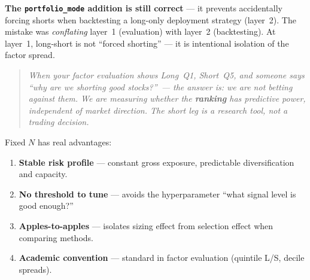 \documentclass[a4paper, 11pt]{report}
\theoremstyle{definition}
\theoremstyle{remark}
\begin{document}
\begin{description}[style=nextline, leftmargin=1.8cm]
        \begin{center}
        \small
        \end{center}

        \medskip
        \textbf{The \texttt{portfolio\_mode} addition is still
        correct} --- it prevents accidentally forcing shorts when
        backtesting a long-only deployment strategy (layer~2).  The
        mistake was \emph{conflating} layer~1 (evaluation) with
        layer~2 (backtesting).  At layer~1, long-short is not
        ``forced shorting'' --- it is intentional isolation of the
        factor spread.

    \item[Lesson]
        \begin{quote}
        \emph{When your factor evaluation shows Long~Q1, Short~Q5,
        and someone says ``why are we shorting good stocks?''\ ---
        the answer is: we are not betting against them.  We are
        measuring whether the \textbf{ranking} has predictive power,
        independent of market direction.  The short leg is a
        research tool, not a trading decision.}
        \end{quote}

    \item[Why Fixed $N$?]
        Fixed $N$ has real advantages:
        \begin{enumerate}[nosep]
            \item \textbf{Stable risk profile} --- constant gross
                  exposure, predictable diversification and capacity.
            \item \textbf{No threshold to tune} --- avoids the
                  hyperparameter ``what signal level is good enough?''
            \item \textbf{Apples-to-apples} --- isolates sizing effect
                  from selection effect when comparing methods.
            \item \textbf{Academic convention} --- standard in factor
                  evaluation (quintile L/S, decile spreads).
        \end{enumerate}


\end{description}
\end{document}
